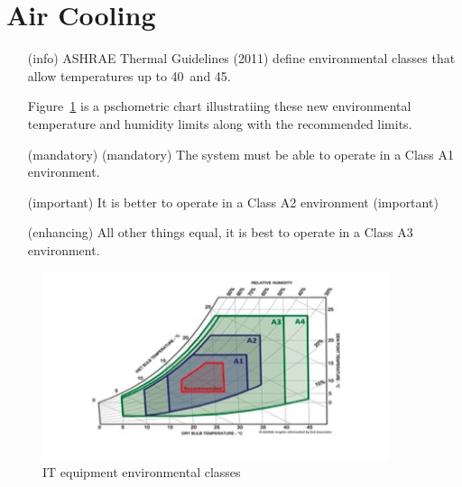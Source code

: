 \section{Air Cooling}
\begin{itemize}
\item[(info)]
ASHRAE Thermal Guidelines (2011) define environmental classes that allow temperatures up to 40\celsius~and
45\celsius.  

Figure~\ref{fig:ITenviron} is a pschometric chart illustratiing these new environmental temperature and humidity limits along with the recommended limits.

\item[(mandatory)]
(mandatory)	The system must be able to operate in a Class A1 environment.  

\item[(important)]
It is better to operate in a Class A2 environment (important) 

\item[(enhancing)]
All other things equal, it is best to operate in a Class A3 environment.
\end{itemize}

\begin{figure}[htbp]
\centering
\includegraphics[width=4in]{fig2}
\caption{IT equipment environmental classes}
\label{fig:ITenviron}
\end{figure}

